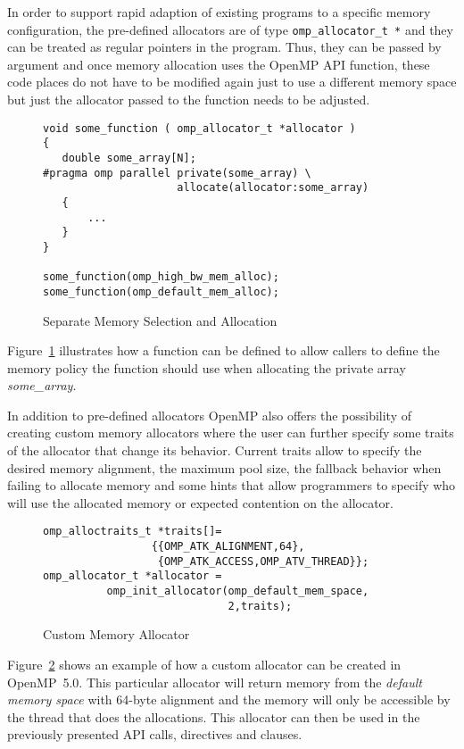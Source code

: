 In order to support rapid adaption of existing programs to a specific memory 
configuration, the pre-defined allocators are of type \texttt{omp\_allocator\_t *} and they can be treated as regular pointers in the program. Thus, they can be passed by argument and once 
memory allocation uses the OpenMP API function, these code places do not 
have to be modified again just to use a different memory space but just the allocator passed to the function needs to be adjusted.

\begin{figure}[t]
\begin{verbatim}
void some_function ( omp_allocator_t *allocator )
{
   double some_array[N];
#pragma omp parallel private(some_array) \
                     allocate(allocator:some_array)
   {
       ...
   }
}

some_function(omp_high_bw_mem_alloc);
some_function(omp_default_mem_alloc);
\end{verbatim}
\caption{Separate Memory Selection and Allocation\label{fig:separation-concerns-alloc}}
\end{figure}

Figure~\ref{fig:separation-concerns-alloc} illustrates how a function can be defined to allow callers to define the memory policy the function should use when allocating the private array \emph{some\_array}.

In addition to pre-defined allocators OpenMP also offers the possibility of creating custom memory allocators where the user can further specify some traits of the allocator that change its behavior. Current traits allow to specify the desired memory alignment, the maximum pool size, the fallback behavior when failing to allocate memory and some hints that allow programmers to specify who will use the allocated memory or expected contention on the allocator.

\begin{figure}[t]
\begin{verbatim}
omp_alloctraits_t *traits[]=
                 {{OMP_ATK_ALIGNMENT,64},
                  {OMP_ATK_ACCESS,OMP_ATV_THREAD}};
omp_allocator_t *allocator = 
          omp_init_allocator(omp_default_mem_space,
                             2,traits);
\end{verbatim}
\caption{Custom Memory Allocator\label{fig:custom-allocator}}
\end{figure}

Figure~\ref{fig:custom-allocator} shows an example of how a custom allocator can be created in OpenMP~5.0. This particular allocator will return memory from the \emph{default memory space} with 64-byte alignment and the memory will only be accessible by the thread that does the allocations. This allocator can then be used in the previously presented API calls, directives and clauses.
